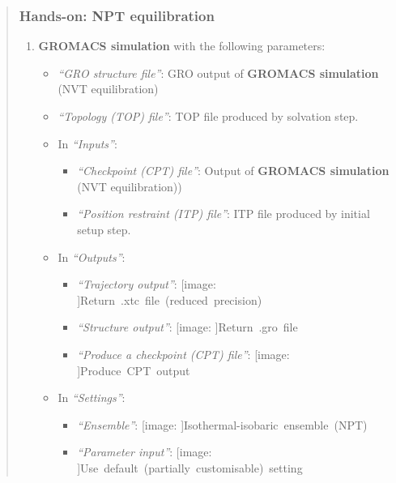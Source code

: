 \documentclass[twocolumn]{bmcart}%
\def\texttt{[image: ]}
\providecommand{\tightlist}{%
  \setlength{\itemsep}{0pt}\setlength{\parskip}{0pt}}
\begin{document}
\begin{quote}
\hypertarget{hands-on-npt-equilibration}{%
\subsubsection{Hands-on: NPT
equilibration}\label{hands-on-npt-equilibration}}

\begin{enumerate}
\def\labelenumi{\arabic{enumi}.}
\tightlist
\item
  \textbf{GROMACS simulation} with the following parameters:

  \begin{itemize}
  \tightlist
  \item
    \emph{``GRO structure file''}: GRO output of \textbf{GROMACS
    simulation} (NVT equilibration)
  \item
    \emph{``Topology (TOP) file''}: TOP file produced by solvation step.
  \item
    In \emph{``Inputs''}:

    \begin{itemize}
    \tightlist
    \item
      \emph{``Checkpoint (CPT) file''}: Output of \textbf{GROMACS
      simulation} (NVT equilibration))
    \item
      \emph{``Position restraint (ITP) file''}: ITP file produced by
      initial setup step.
    \end{itemize}
  \item
    In \emph{``Outputs''}:

    \begin{itemize}
    \tightlist
    \item
      \emph{``Trajectory output''}:
      \texttt{Return\ .xtc\ file\ (reduced\ precision)}
    \item
      \emph{``Structure output''}: \texttt{Return\ .gro\ file}
    \item
      \emph{``Produce a checkpoint (CPT) file''}:
      \texttt{Produce\ CPT\ output}
    \end{itemize}
  \item
    In \emph{``Settings''}:

    \begin{itemize}
    \tightlist
    \item
      \emph{``Ensemble''}: \texttt{Isothermal-isobaric\ ensemble\ (NPT)}
    \item
      \emph{``Parameter input''}:
      \texttt{Use\ default\ (partially\ customisable)\ setting}


\end{itemize}
\end{itemize}
\end{enumerate}
\end{quote}
\end{document}
